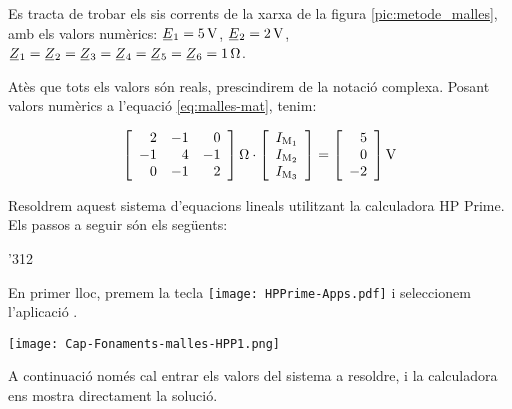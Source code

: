 \begin{exemple}\label{ex:Malles}
	\addcontentsxms{\Malles}	
    Es tracta de trobar els sis corrents de la xarxa de la figura \vref{pic:metode_malles}, amb els valors numèrics: $\cmplx{E}_1=\qty{5}{V}$, $\cmplx{E}_2=\qty{2}{V}$, $\cmplx{Z}_1=\cmplx{Z}_2=\cmplx{Z}_3=\cmplx{Z}_4=\cmplx{Z}_5=\cmplx{Z}_6=\qty{1}{\ohm}$.

    Atès que tots els valors són reals, prescindirem de la notació complexa. Posant valors numèrics a l'equació \eqref{eq:malles-mat}, tenim:

    \[
      \begin{bmatrix}\begin{array}{rrr} 
          2 & -1 &  0 \\
         -1 &  4 & -1 \\
          0 &  -1 & 2 
      \end{array}\end{bmatrix}\unit{\ohm}
      \cdot
      \begin{bmatrix}\begin{array}{c} 
            I\ped{M_1} \\
            I\ped{M_2} \\
            I\ped{M_3} 
      \end{array}\end{bmatrix}
      =
      \begin{bmatrix}\begin{array}{r} 
            5 \\
            0 \\
            -2 
      \end{array}\end{bmatrix}\unit{V}
    \]

    Resoldrem aquest sistema d'equacions lineals utilitzant la calculadora \textsf{HP Prime}. Els passos a seguir són els següents:

    \begin{dingautolist}{'312}
     \item En primer lloc, premem la tecla \texttt{[image: HPPrime-Apps.pdf]} i seleccionem l'aplicació .

         \texttt{[image: Cap-Fonaments-malles-HPP1.png]}
    \item A continuació només cal entrar els valors del sistema a resoldre, i la calculadora ens mostra directament la solució.


\end{dingautolist}
\end{exemple}

